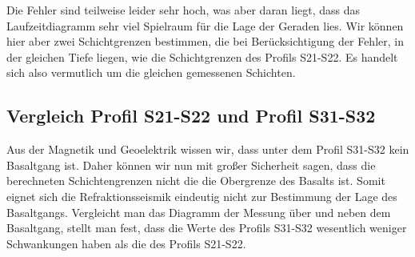 



Die Fehler sind teilweise leider sehr hoch, was aber daran liegt, dass das Laufzeitdiagramm sehr viel Spielraum für die Lage der Geraden lies. 
Wir können hier aber zwei Schichtgrenzen bestimmen, die bei Berücksichtigung der Fehler, in der gleichen Tiefe liegen, wie die Schichtgrenzen des Profils S21-S22. Es handelt sich also vermutlich um die gleichen gemessenen Schichten.

\subsection{Vergleich Profil S21-S22 und Profil S31-S32}

Aus der Magnetik und Geoelektrik wissen wir, dass unter dem Profil S31-S32 kein Basaltgang ist. Daher können wir nun mit großer Sicherheit sagen, dass die berechneten Schichtengrenzen nicht die die Obergrenze des Basalts ist. Somit eignet sich die Refraktionsseismik eindeutig nicht zur Bestimmung der Lage des Basaltgangs. Vergleicht man das Diagramm der Messung über und neben dem Basaltgang, stellt man fest, dass die Werte des Profils S31-S32 wesentlich weniger Schwankungen haben als die des Profils S21-S22.


